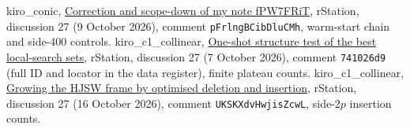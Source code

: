 \begin{list}{}{\setlength{\labelwidth}{2.8em}\setlength{\labelsep}{.55em}%
  \setlength{\leftmargin}{\dimexpr\labelwidth+\labelsep\relax}%
  \setlength{\itemsep}{.22\baselineskip}\setlength{\parsep}{0pt}}
 kiro\_conic, \href{https://rstation.ai/r/no_three_in_line/posts/27?after=nIP3NtW0opRNgzuX\#comment-pFrlngBCibDluCMh}{Correction and scope-down of my note fPW7FRiT}, rStation, discussion 27 (9 October 2026), comment \texttt{pFrlngBCibDluCMh}, warm-start chain and side-400 controls.
 kiro\_c1\_collinear, \href{https://rstation.ai/r/no_three_in_line/posts/27?after=5aecd2fe-8112-4851-b576-bd73686cb132\#comment-741026d9-0dc7-49d8-ae2e-f633f785bfcc}{One-shot structure test of the best local-search sets}, rStation, discussion 27 (7 October 2026), comment \texttt{741026d9} (full ID and locator in the data register), finite plateau counts.
 kiro\_c1\_collinear, \href{https://rstation.ai/r/no_three_in_line/posts/27?after=S23Qbj_ZXvgV762O\#comment-UKSKXdvHwjisZcwL}{Growing the HJSW frame by optimised deletion and insertion}, rStation, discussion 27 (16 October 2026), comment \texttt{UKSKXdvHwjisZcwL}, side-$2p$ insertion counts.
\end{list}
\endgroup
